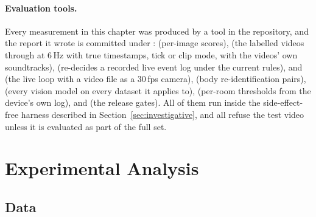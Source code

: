 \paragraph{Evaluation tools.} Every measurement in this chapter was produced by a tool in the repository, and the report it wrote is committed under :
 (per-image scores),  (the labelled videos through  at 6\,Hz with true timestamps, tick or clip mode, with the videos' own soundtracks),  (re-decides a recorded live event log under the current rules),  and  (the live loop with a video file as a 30\,fps camera),  (body re-identification pairs),  (every vision model on every dataset it applies to),  (per-room thresholds from the device's own log), and  (the release gates). All of them run inside the side-effect-free harness described in Section~\ref{sec:investigative}, and all refuse the test video  unless it is evaluated as part of the full set.

\section{Experimental Analysis}

\subsection{Data}
\label{sec:data}

